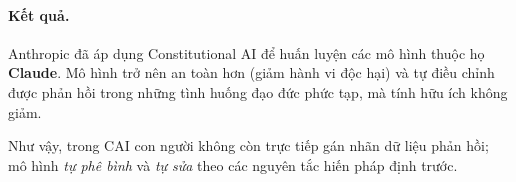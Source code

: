 \paragraph{Kết quả.}
    Anthropic đã áp dụng Constitutional AI để huấn luyện các mô hình thuộc họ \textbf{Claude}. Mô hình trở nên an toàn hơn (giảm hành vi độc hại) và tự điều chỉnh được phản hồi trong những tình huống đạo đức phức tạp, mà tính hữu ích không giảm.

\noindent
Như vậy, trong CAI con người không còn trực tiếp gán nhãn dữ liệu phản hồi; mô hình \emph{tự phê bình} và \emph{tự sửa} theo các nguyên tắc hiến pháp định trước.
